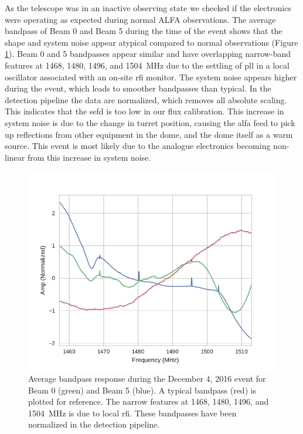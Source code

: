 \documentclass[a4paper,fleqn,usenatbib]{mnras}
\begin{document}
As the telescope was in an inactive observing state we checked if the
electronics were operating as expected during normal ALFA observations.  The
average bandpass of Beam 0 and Beam 5 during the time of the event shows that
the shape and system noise appear atypical compared to normal observations
(Figure \ref{fig:bandpass_response}).  Beam 0 and 5 bandpasses appear similar
and have overlapping narrow-band features at 1468, 1480, 1496, and 1504~MHz due
to the settling of \gls{pll} in a local oscillator associated with an on-site
\gls{rfi} monitor.  The system noise appears higher during the event, which
leads to smoother bandpasses than typical.  In the detection pipeline the data
are normalized, which removes all absolute scaling. This indicates that the
\gls{sefd} is too low in our flux calibration.  This increase in system noise is
due to the change in turret position, causing the \gls{alfa} feed to pick up
reflections from other equipment in the dome, and the dome itself as a warm
source.  This event is most likely due to the analogue electronics becoming
non-linear from this increase in system noise.

\begin{figure}
    \includegraphics[width=1.0\linewidth]{figures/bandpass_response.pdf}
    \caption{Average bandpass response during the December 4, 2016 event for
    Beam 0 (green) and Beam 5 (blue). A typical bandpass (red) is plotted for
    reference. The narrow features at 1468, 1480, 1496, and 1504~MHz is due to
    local \gls{rfi}. These bandpasses have been normalized in the detection
    pipeline.
    }
    \label{fig:bandpass_response}
\end{figure}
\end{document}
